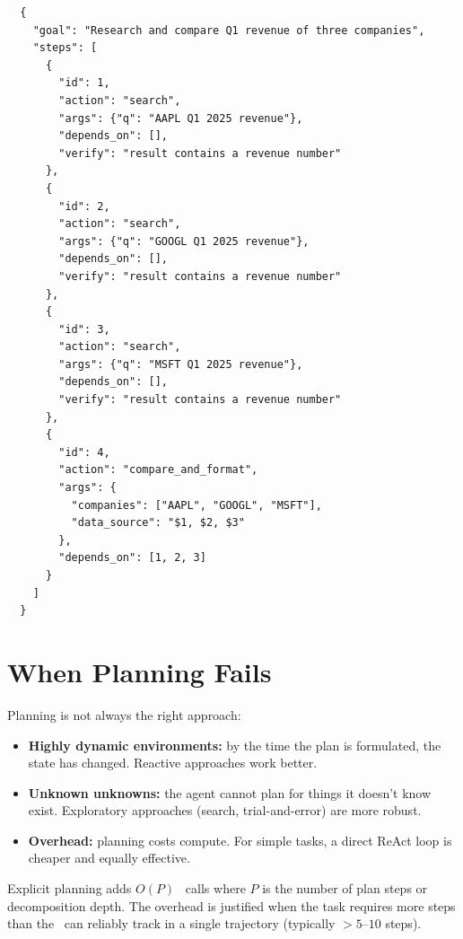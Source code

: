 \begin{example}
	\begin{lstlisting}
  {
    "goal": "Research and compare Q1 revenue of three companies",
    "steps": [
      {
        "id": 1,
        "action": "search",
        "args": {"q": "AAPL Q1 2025 revenue"},
        "depends_on": [],
        "verify": "result contains a revenue number"
      },
      {
        "id": 2,
        "action": "search",
        "args": {"q": "GOOGL Q1 2025 revenue"},
        "depends_on": [],
        "verify": "result contains a revenue number"
      },
      {
        "id": 3,
        "action": "search",
        "args": {"q": "MSFT Q1 2025 revenue"},
        "depends_on": [],
        "verify": "result contains a revenue number"
      },
      {
        "id": 4,
        "action": "compare_and_format",
        "args": {
          "companies": ["AAPL", "GOOGL", "MSFT"],
          "data_source": "$1, $2, $3"
        },
        "depends_on": [1, 2, 3]
      }
    ]
  }
  \end{lstlisting}
\end{example}

\section{When Planning Fails}

Planning is not always the right approach:

\begin{itemize}
	\item \textbf{Highly dynamic environments:} by the time the plan is formulated, the state has changed. Reactive approaches work better.
	\item \textbf{Unknown unknowns:} the agent cannot plan for things it doesn't know exist. Exploratory approaches (search, trial-and-error) are more robust.
	\item \textbf{Overhead:} planning costs compute. For simple tasks, a direct ReAct loop is cheaper and equally effective.
\end{itemize}

\begin{theorem}
	Explicit planning adds $O(P)$ \llm\ calls where $P$ is the number of plan steps or decomposition depth. The overhead is justified when the task requires more steps than the \llm\ can reliably track in a single trajectory (typically $> 5$--$10$ steps).
\end{theorem}


